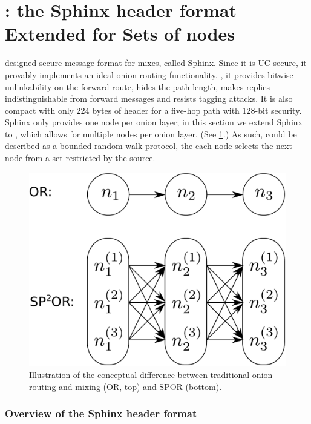
\section{\Sphinxes: the Sphinx header format Extended for Sets of nodes}%
\label{Sphinxes}

\Textcite{Sphinx} designed  secure message format for mixes, called 
Sphinx.
Since it is \ac{UC} secure, it provably implements an ideal onion routing 
functionality.
\Ie, it provides bitwise unlinkability on the forward route, hides the path 
length, makes replies indistinguishable from forward messages and resists 
tagging attacks.
It is also compact with only 224 bytes of header for a five-hop path with 
128-bit security. 
Sphinx only provides one node per onion layer; in this section we extend Sphinx 
to \Sphinxes, which allows for multiple nodes per onion layer.
(See \cref{fig:OR-POR}.)
As such, \Sphinxes could be described as a bounded random-walk protocol, \ie the 
each node selects the next node from a set restricted by the source.

\begin{figure}
  \centering
    \includegraphics[width=0.65\linewidth]{figures/principle_SPOR.pdf}
  \caption{\label{fig:OR-POR}%
    Illustration of the conceptual difference between traditional onion routing 
and mixing (OR, top) and \ac{SPOR} (bottom).
  }
\end{figure}

\subsubsection{Overview of the Sphinx header format}

